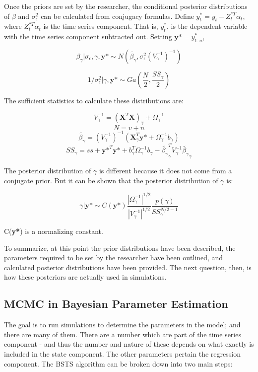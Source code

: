 \documentclass[11pt, oneside]{book}   	%
\begin{document}
Once the priors are set by the researcher, the conditional posterior distributions of $\beta$ and $\sigma_{\epsilon}^{2}$ can be calculated from conjugacy formulas. Define $y_{t}^{*} = y_{t} - Z_{t}^{*T}\alpha_{t}$, where $Z_{t}^{*T}\alpha_{t}$ is the time series component. That is, $y_{t}^{*}$, is the dependent variable with the time series component subtracted out. Setting $\textbf{y*}=y^{*}_{1:n}$,

$$\beta_{\gamma} | \sigma_{\epsilon}, \gamma, \textbf{y*} \sim N(\tilde{\beta_{\gamma}}, \sigma_{\epsilon}^{2}(V_{\gamma}^{-1})^{-1})$$

$$1/ \sigma_{\epsilon}^{2} | \gamma, \textbf{y*} \sim Ga(\frac{N}{2}, \frac{SS_{\gamma}}{2})$$

The sufficient statistics to calculate these distributions are:

$$ V_{\gamma}^{-1} = (\textbf{X}^{T}\textbf{X})_{\gamma} + \Omega_{\gamma}^{-1}$$
$$ N = v + n$$
$$ \tilde{\beta_{\gamma}} = (V_{\gamma}^{-1})^{-1}(\textbf{X}_{\gamma}^{T}\textbf{y*} + \Omega_{\gamma}^{-1}b_{\gamma})$$
$$ SS_{\gamma} = ss + \textbf{y*}^{T}\textbf{y*} + b_{\gamma}^{T} \Omega_{\gamma}^{-1} b_{\gamma} -  \tilde{\beta_{\gamma}}_{\gamma}^{T} V_{\gamma}^{-1}  \tilde{\beta_{\gamma}}_{\gamma}$$

The posterior distribution of $\gamma$ is different because it does not come from a conjugate prior. But it can be shown that the posterior distribution of $\gamma$ is:

$$ \gamma | \textbf{y*} \sim C(\textbf{y*}) \frac { |\Omega_{\gamma}^{-1}|^{1/2}} {|V_{\gamma}^{-1}|^{1/2}} \frac{p(\gamma)}{SS_{\gamma}^{N/2 - 1}}$$


C(\textbf{y*}) is a normalizing constant. 

To summarize, at this point the prior distributions have been described, the parameters required to be set by the researcher have been outlined, and calculated posterior distributions have been provided. The next question, then, is how these posteriors are actually used in simulations.

\subsection {MCMC in Bayesian Parameter Estimation}

The goal is to run simulations to determine the parameters in the model; and there are many of them. There are a number which are part of the time series component - and thus the number and nature of these depends on what exactly is included in the state component. The other parameters pertain the regression component. The BSTS algorithm can be broken down into two main steps:
\end{document}
